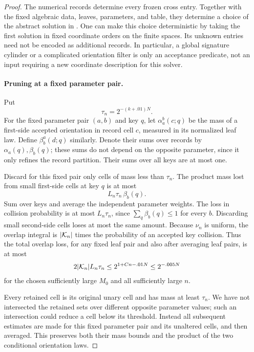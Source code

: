 \begin{proof}
The numerical records determine every frozen cross entry.
Together with the fixed algebraic data, leaves, parameters,
and table, they determine a choice of the abstract solution
in .  One can make this choice
deterministic by taking the first solution in fixed coordinate
orders on the finite spaces.  Its unknown entries need not
be encoded as additional records.  In particular, a global
signature cylinder or a complicated orientation filter is
only an acceptance predicate, not an input requiring a new
coordinate description for this solver.

\paragraph{Pruning at a fixed parameter pair.}
Put
\begin{equation}\label{eq:cell-threshold}
 \tau_n=2^{-(k+.01)N}.
\end{equation}
For the fixed parameter pair $(a,b)$ and key $q$, let
$\alpha_a^b(c;q)$ be the mass of a first-side accepted
orientation in record cell $c$, measured in its normalized
leaf law.  Define $\beta_b^a(d;q)$ similarly.  Denote their
sums over records by $\alpha_a(q),\beta_b(q)$; these sums
do not depend on the opposite parameter, since it only
refines the record partition.  Their sums over all keys
are at most one.

Discard for this fixed pair only cells of mass less than
$\tau_n$.  The product mass lost from small first-side cells
at key $q$ is at most
\[
 L_n\tau_n\,\beta_b(q).
\]
Sum over keys and average the independent parameter weights.
The loss in collision probability is at most $L_n\tau_n$,
since $\sum_q\beta_b(q)\le1$ for every $b$.
Discarding small second-side cells loses at most the same amount.
Because $\nu_n$ is uniform, the overlap integral is
$|\mathcal K_n|$ times the probability of an accepted key collision.
Thus the total overlap loss, for any fixed leaf pair and
also after averaging leaf pairs, is at most
\begin{equation}\label{eq:fubini-pruning}
 2|\mathcal K_n|L_n\tau_n
 \le 2^{1+Cn-.01N}
 \le 2^{-.005N}
\end{equation}
for the chosen sufficiently large $M_0$ and all sufficiently
large $n$.

Every retained cell is its original unary cell and has mass
at least $\tau_n$.  We have not intersected the retained
sets over different opposite parameter values; such an
intersection could reduce a cell below its threshold.
Instead all subsequent estimates are made for this fixed
parameter pair and its unaltered cells, and then averaged.
This preserves both their mass bounds and the product of
the two conditional orientation laws.


\end{proof}

